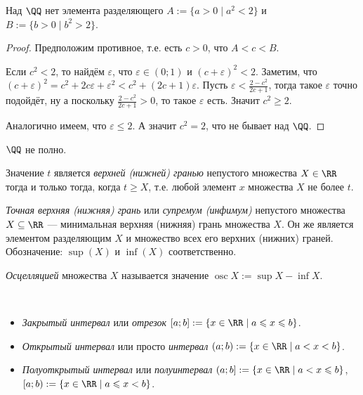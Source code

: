 \documentclass[12pt,a4paper]{article}
\DeclareMathOperator{\osc}{osc}
\begin{document}
    \begin{statement*}
        Над $\QQ$ нет  элемента разделяющего $A := \{a > 0 \mid a^2 < 2\}$ и $B := \{b > 0 \mid b^2 > 2\}$.
    \end{statement*}

    \begin{proof}
        Предположим противное, т.е. есть $c > 0$, что $A < c < B$.

        Если $c^2 < 2$, то найдём $\varepsilon$, что $\varepsilon \in (0; 1)$ и $(c + \varepsilon)^2 < 2$. Заметим, что $(c + \varepsilon)^2 = c^2 + 2c\varepsilon + \varepsilon^2 < c^2 + (2c + 1)\varepsilon$. Пусть $\varepsilon < \frac{2 - c^2}{2c+ 1}$, тогда такое $\varepsilon$ точно подойдёт, ну а поскольку $\frac{2 - c^2}{2c + 1} > 0$, то такое $\varepsilon$ есть. Значит $c^2 \geqslant 2$.
        
        Аналогично имеем, что $\varepsilon \leqslant 2$. А значит $c^2 = 2$, что не бывает над $\QQ$.
    \end{proof}

    \begin{corollary*}
        $\QQ$ не полно.
    \end{corollary*}
    
    \begin{definition}
        Значение $t$ является \emph{верхней (нижней) гранью} непустого множества $X \in \RR$ тогда и только тогда, когда $t \geqslant X$, т.е. любой элемент $x$ множества $X$ не более $t$.
        
        
        \emph{Точная верхняя (нижняя) грань} или \emph{супремум (инфимум)} непустого множества $X \subseteq \RR$ --- минимальная верхняя (нижняя) грань множества $X$. Он же является элементом разделяющим $X$ и множество всех его верхних (нижних) граней. Обозначение: $\sup(X)$ и $\inf(X)$ соответственно.

        \emph{Осцелляцией} множества $X$ называется значение $\osc X := \sup X - \inf X$.
    \end{definition}

    \begin{definition}\ 
        \begin{itemize}
            \item \emph{Закрытый интервал} или \emph{отрезок} $[a;b]:=\{x\in\RR \mid a \leqslant x \leqslant b\}$.
            \item \emph{Открытый интервал} или просто \emph{интервал} $(a;b):=\{x\in\RR \mid a < x < b\}$.
            \item \emph{Полуоткрытый интервал} или \emph{полуинтервал} $(a;b] := \{x\in\RR \mid a < x \leqslant b\}$, $[a;b):=\{x\in\RR \mid a \leqslant x < b\}$.
        \end{itemize}
    \end{definition}
\end{document}
